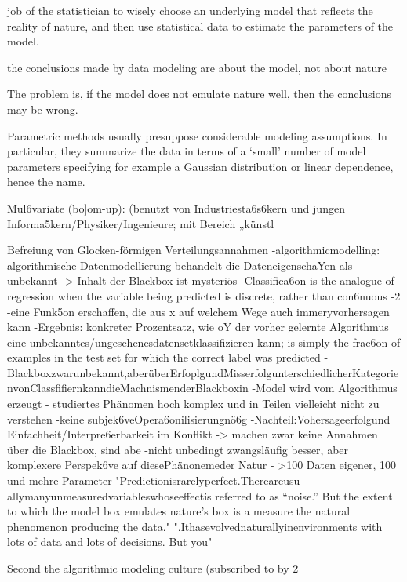 \documentclass[authoryear,review,3p]{elsarticle}
\begin{document}
job of the statistician to wisely choose an underlying model that reflects the reality of nature, and then use statistical data to estimate the parameters of the model.

the conclusions made by data modeling are about the model, not about nature

The problem is, if the model does not emulate nature well, then the conclusions may be wrong. 

Parametric methods usually presuppose considerable modeling assumptions. In particular, they summarize the data in terms of a ‘small’ number of model parameters specifying for example a Gaussian distribution or linear dependence, hence the name. 




Mul6variate (bo]om-up): (benutzt von Industriesta6s6kern und jungen Informa5kern/Physiker/Ingenieure; mit Bereich „künstl

Befreiung von Glocken-förmigen Verteilungsannahmen
-algorithmicmodelling: algorithmische Datenmodellierung behandelt die DateneigenschaYen als unbekannt -> Inhalt der Blackbox ist mysteriös
-Classifica6on is the analogue of regression when the variable being predicted is discrete, rather than con6nuous
-2%
-eine Funk5on erschaffen, die aus x auf welchem Wege auch immeryvorhersagen kann
-Ergebnis: konkreter Prozentsatz, wie oY der vorher gelernte Algorithmus eine unbekanntes/ungesehenesdatensetklassifizieren kann; is simply the frac6on of examples in the test set for which the correct label was predicted -Blackboxzwarunbekannt,aberüberErfoplgundMisserfolgunterschiedlicherKategorienvonClassfifiernkanndieMachnismenderBlackboxin -Model wird vom Algorithmus erzeugt
- studiertes Phänomen hoch komplex und in Teilen vielleicht nicht zu verstehen
-keine subjek6veOpera6onilisierungnö6g
-Nachteil:Vohersageerfolgund Einfachheit/Interpre6erbarkeit im Konflikt -> machen zwar keine Annahmen über die Blackbox, sind abe -nicht unbedingt zwangsläufig besser, aber komplexere Perspek6ve auf diesePhänonemeder Natur
- >100 Daten eigener, 100 und mehre Parameter
"Predictionisrarelyperfect.Thereareusu- allymanyunmeasuredvariableswhoseeffectis referred to as “noise.” But the extent to which the model box emulates nature’s box is a measure the natural phenomenon producing the data."
".Ithasevolvednaturallyinenvironments with lots of data and lots of decisions. But you"

Second the algorithmic modeling culture (subscribed to by 2%
\end{document}
